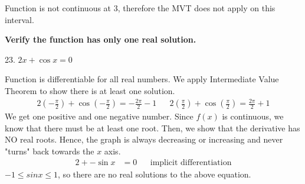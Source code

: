 \documentclass{article}
\begin{document}
\begin{description}
            Function is not continuous at 3, therefore the MVT does not apply on this interval.
      \item\textbf{Verify the function has only one real solution.}
            \begin{description}
                  \item 23. $2x + \cos{x} = 0$

                        Function is differentiable for all real numbers. We apply Intermediate Value Theorem to
                        show there is at least one solution.
                        \begin{align*}
                              2\left(-\frac{\pi}{2}\right) + \cos{\left(-\frac{\pi}{2}\right)} = -\frac{2\pi}{2} - 1 &  & 2\left(\frac{\pi}{2}\right) + \cos{\left(\frac{\pi}{2}\right)} = \frac{2\pi}{2} + 1
                        \end{align*}
                        We get one positive and one negative number. Since $f(x)$ is continuous, we know that there must
                        be at least one root. Then, we show that the derivative has NO real roots. Hence, the graph is
                        always decreasing or increasing and never "turns" back towards the $x$ axis.
                        \begin{align*}
                              2 + -\sin{x} & = 0 &  & \text{implicit differentiation}
                        \end{align*}
                        $-1 \leq sin{x} \leq 1$, so there are no real solutions to the above equation.


\end{description}
\end{description}
\end{document}
